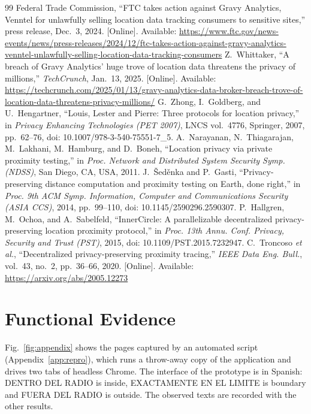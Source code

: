 \documentclass[conference,letterpaper]{IEEEtran}
\begin{document}
\begin{thebibliography}{99}
 Federal Trade Commission, ``FTC takes action against Gravy Analytics, Venntel for unlawfully selling location data tracking consumers to sensitive sites,'' press release, Dec.~3, 2024. [Online]. Available: \url{https://www.ftc.gov/news-events/news/press-releases/2024/12/ftc-takes-action-against-gravy-analytics-venntel-unlawfully-selling-location-data-tracking-consumers}
 Z.~Whittaker, ``A breach of Gravy Analytics' huge trove of location data threatens the privacy of millions,'' \emph{TechCrunch}, Jan.~13, 2025. [Online]. Available: \url{https://techcrunch.com/2025/01/13/gravy-analytics-data-broker-breach-trove-of-location-data-threatens-privacy-millions/}
 G.~Zhong, I.~Goldberg, and U.~Hengartner, ``Louis, Lester and Pierre: Three protocols for location privacy,'' in \emph{Privacy Enhancing Technologies (PET 2007)}, LNCS vol.~4776, Springer, 2007, pp.~62--76, doi: 10.1007/978-3-540-75551-7\_5.
 A.~Narayanan, N.~Thiagarajan, M.~Lakhani, M.~Hamburg, and D.~Boneh, ``Location privacy via private proximity testing,'' in \emph{Proc. Network and Distributed System Security Symp. (NDSS)}, San Diego, CA, USA, 2011.
 J.~\v{S}ed\v{e}nka and P.~Gasti, ``Privacy-preserving distance computation and proximity testing on Earth, done right,'' in \emph{Proc. 9th ACM Symp. Information, Computer and Communications Security (ASIA CCS)}, 2014, pp.~99--110, doi: 10.1145/2590296.2590307.
 P.~Hallgren, M.~Ochoa, and A.~Sabelfeld, ``InnerCircle: A parallelizable decentralized privacy-preserving location proximity protocol,'' in \emph{Proc. 13th Annu. Conf. Privacy, Security and Trust (PST)}, 2015, doi: 10.1109/PST.2015.7232947.
 C.~Troncoso \emph{et al.}, ``Decentralized privacy-preserving proximity tracing,'' \emph{IEEE Data Eng. Bull.}, vol.~43, no.~2, pp.~36--66, 2020. [Online]. Available: \url{https://arxiv.org/abs/2005.12273}
\end{thebibliography}

\appendices
\section{Functional Evidence}\raggedright\label{app:evidence}
Fig.~\ref{fig:appendix} shows the pages captured by an automated script (Appendix~\ref{app:repro}), which runs a throw-away copy of the application and drives two tabs of headless Chrome. The interface of the prototype is in Spanish: DENTRO DEL RADIO is inside, EXACTAMENTE EN EL LIMITE is boundary and FUERA DEL RADIO is outside. The observed texts are recorded with the other results.
\end{document}
